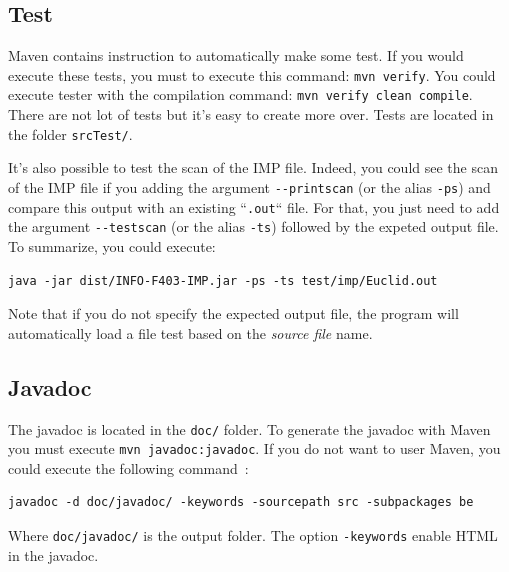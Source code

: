 \documentclass[a4paper,11pt]{article}
\begin{document}
  \subsection{Test}
    \label{subsec:test}
    Maven contains instruction to automatically make some test.  If you would execute these tests, you must to execute this command: \verb|mvn verify|.  You could execute tester with the compilation command: \verb|mvn verify clean compile|.\\
    There are not lot of tests but it's easy to create more over.  Tests are located in the folder \verb|srcTest/|.
      
    It's also possible to test the scan of the IMP file.  Indeed, you could see the scan of the IMP file if you adding the argument \verb|--printscan| (or the alias \verb|-ps|) and compare this output with an existing ``\verb|.out|`` file.  For that, you just need to add the argument \verb|--testscan| (or the alias \verb|-ts|) followed by the expeted output file.\\
    To summarize, you could execute:
    \begin{verbatim}
java -jar dist/INFO-F403-IMP.jar -ps -ts test/imp/Euclid.out\end{verbatim}
    Note that if you do not specify the expected output file, the program will automatically load a file test based on the \textit{source file} name.
    
  \subsection{Javadoc}
    The javadoc is located in the \verb|doc/| folder. To generate the javadoc with Maven you must execute \verb|mvn javadoc:javadoc|.  If you do not want to user Maven, you could execute the following command~:
    \begin{verbatim}
javadoc -d doc/javadoc/ -keywords -sourcepath src -subpackages be
    \end{verbatim}
    Where \verb|doc/javadoc/| is the output folder. The option \verb|-keywords| enable HTML in the javadoc.
    
\end{document}
